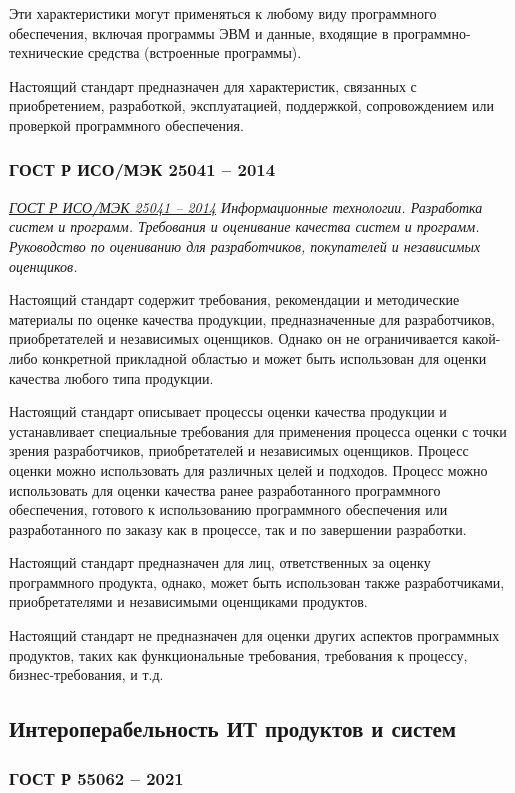 Эти характеристики могут применяться к любому виду программного обеспечения,
включая программы ЭВМ и данные,
входящие в программно-технические средства (встроенные программы).

Настоящий стандарт предназначен для характеристик,
связанных с приобретением, разработкой, эксплуатацией, поддержкой,
сопровождением или проверкой программного обеспечения.

\subsubsection{ГОСТ Р ИСО/МЭК 25041 -- 2014}

\emph{\href{https://docs.cntd.ru/document/1200111122}
{ГОСТ Р ИСО/МЭК 25041 -- 2014}
Информационные технологии.
Разработка систем и программ.
Требования и оценивание качества систем и программ.
Руководство по оцениванию для разработчиков, покупателей и независимых оценщиков.
}

Настоящий стандарт содержит требования,
рекомендации и методические материалы по оценке качества продукции,
предназначенные для разработчиков, приобретателей и независимых оценщиков.
Однако он не ограничивается какой-либо конкретной прикладной областью
и может быть использован для оценки качества любого типа продукции.

Настоящий стандарт описывает процессы оценки качества продукции
и устанавливает специальные требования
для применения процесса оценки с точки зрения разработчиков,
приобретателей и независимых оценщиков.
Процесс оценки можно использовать для различных целей и подходов.
Процесс можно использовать
для оценки качества ранее разработанного программного обеспечения,
готового к использованию программного обеспечения
или разработанного по заказу как в процессе, так и по завершении разработки.

Настоящий стандарт предназначен для лиц,
ответственных за оценку программного продукта, однако,
может быть использован также разработчиками,
приобретателями и независимыми оценщиками продуктов.

Настоящий стандарт не предназначен
для оценки других аспектов программных продуктов,
таких как функциональные требования,
требования к процессу, бизнес-требования, и т.д.

\subsection{Интероперабельность ИТ продуктов и систем}

\subsubsection{ГОСТ Р 55062 -- 2021}

